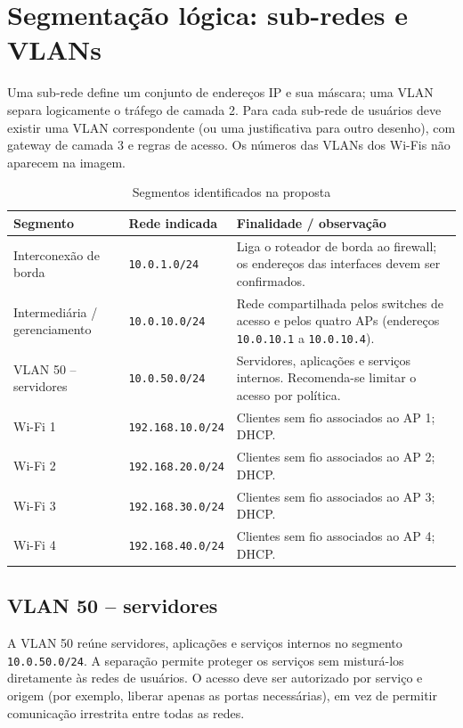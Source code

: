 \documentclass[11pt,a4paper]{article}
\begin{document}
\section{Segmentação lógica: sub-redes e VLANs}

Uma sub-rede define um conjunto de endereços IP e sua máscara; uma VLAN separa logicamente o tráfego de camada 2. Para cada sub-rede de usuários deve existir uma VLAN correspondente (ou uma justificativa para outro desenho), com gateway de camada 3 e regras de acesso. Os números das VLANs dos Wi-Fis não aparecem na imagem.

\begin{table}[h]
\centering
\caption{Segmentos identificados na proposta}
\label{tab:subredes}
\begin{tabularx}{\textwidth}{@{}l l X@{}}
\toprule
\textbf{Segmento} & \textbf{Rede indicada} & \textbf{Finalidade / observação} \\
\midrule
Interconexão de borda & \texttt{10.0.1.0/24} & Liga o roteador de borda ao firewall; os endereços das interfaces devem ser confirmados. \\
Intermediária / gerenciamento & \texttt{10.0.10.0/24} & Rede compartilhada pelos switches de acesso e pelos quatro APs (endereços \texttt{10.0.10.1} a \texttt{10.0.10.4}). \\
VLAN 50 -- servidores & \texttt{10.0.50.0/24} & Servidores, aplicações e serviços internos. Recomenda-se limitar o acesso por política. \\
Wi-Fi 1 & \texttt{192.168.10.0/24} & Clientes sem fio associados ao AP 1; DHCP. \\
Wi-Fi 2 & \texttt{192.168.20.0/24} & Clientes sem fio associados ao AP 2; DHCP. \\
Wi-Fi 3 & \texttt{192.168.30.0/24} & Clientes sem fio associados ao AP 3; DHCP. \\
Wi-Fi 4 & \texttt{192.168.40.0/24} & Clientes sem fio associados ao AP 4; DHCP. \\
\bottomrule
\end{tabularx}
\end{table}

\subsection{VLAN 50 -- servidores}
A VLAN 50 reúne servidores, aplicações e serviços internos no segmento \texttt{10.0.50.0/24}. A separação permite proteger os serviços sem misturá-los diretamente às redes de usuários. O acesso deve ser autorizado por serviço e origem (por exemplo, liberar apenas as portas necessárias), em vez de permitir comunicação irrestrita entre todas as redes.
\end{document}
